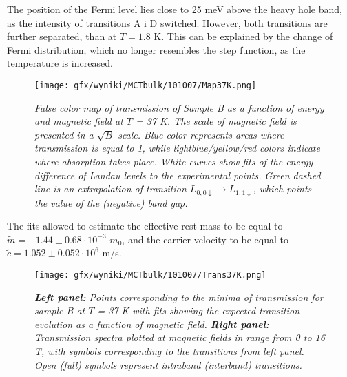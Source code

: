 \documentclass[titlepage,a4paper]{book}
\begin{document}
The position of the Fermi level lies close to 25 meV above the heavy hole band, as the intensity of transitions A i D switched. However, both transitions are further separated, than at $T = 1.8$ K. This can be explained by the change of Fermi distribution, which no longer resembles the step function, as the temperature is increased.

\begin{figure}[ht]
	\centering
	\texttt{[image: gfx/wyniki/MCTbulk/101007/Map37K.png]}
	\vspace{-10pt}
	\caption{\textit{False color map of transmission of Sample B as a function of energy and magnetic field at $T$ = 37 K. The scale of magnetic field is presented in a $\sqrt{B}$ scale. Blue color represents areas where transmission is equal to 1, while lightblue/yellow/red colors indicate where absorption takes place. White curves show fits of the energy difference of Landau levels to the experimental points. Green dashed line is an extrapolation of transition $L_{0,0\downarrow}\rightarrow L_{1,1\downarrow}$, which points the value of the (negative) band gap.}}
	\label{fig:Map_101007_37K}
\end{figure} 

The fits allowed to estimate the effective rest mass to be equal to $\tilde m = -1.44 \pm 0.68 \cdot 10^{-3}$ $m_0$, and the carrier velocity to be equal to $\tilde{c} = 1.052 \pm 0.052 \cdot 10^6$ m/s.

\begin{figure}[H]
	\centering
	\texttt{[image: gfx/wyniki/MCTbulk/101007/Trans37K.png]}
	\vspace{-10pt}
	\caption{\textit{\textbf{Left panel:} Points corresponding to the minima of transmission for sample B at $T$ = 37 K with fits showing the expected transition evolution as a function of magnetic field. \textbf{Right panel:} Transmission spectra plotted at magnetic fields in range from 0 to 16 T, with symbols corresponding to the transitions from left panel. Open (full) symbols represent intraband (interband) transitions.}}
	\label{fig:Spectra_101007_37K}
\end{figure}  
\end{document}

